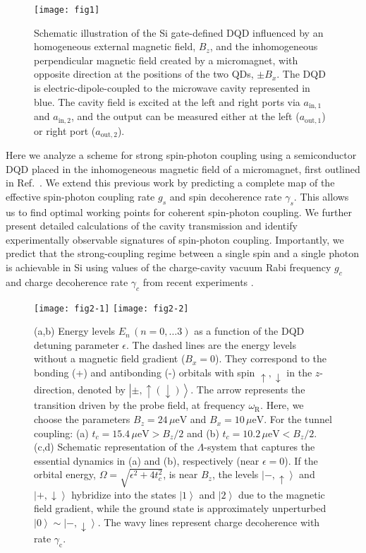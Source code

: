 \documentclass[twocolumn,english,aps,prl,preprint,reprint,showpacs,longbibliography,showkeys]{revtex4-1}
\begin{document}
\begin{figure}
\texttt{[image: fig1]}
\protect\caption{\label{fig:figure1-1}  Schematic illustration of the Si gate-defined DQD influenced by an homogeneous external magnetic field, $B_z$, and the inhomogeneous perpendicular magnetic field created by  a micromagnet, with opposite direction at the positions of the two QDs, $\pm B_x$. The DQD is electric-dipole-coupled to the microwave cavity represented in blue. 
The cavity field is excited at the left and right ports via $a_{\mathrm{in},1}$ and $a_{\mathrm{in},2}$, and the output can be measured  either at the left ($a_{\mathrm{out},1}$) or right port ($a_{\mathrm{out},2}$).}
\end{figure} 

Here we analyze a scheme for strong spin-photon coupling using a semiconductor DQD placed in the inhomogeneous magnetic field of a micromagnet, first outlined in Ref.~\cite{Hu2012}. We extend this previous work by predicting a complete map of the effective spin-photon coupling rate $g_s$ and spin decoherence rate $\gamma_s$. 
This allows us to find optimal working points for coherent spin-photon coupling. 
We further present detailed calculations of the cavity transmission and identify experimentally observable signatures of spin-photon coupling. Importantly, we predict that the strong-coupling regime between a single spin and a single photon is achievable in Si using values of the charge-cavity vacuum Rabi frequency $g_c$ and charge decoherence rate $\gamma_c$ from recent experiments \cite{Mi2017,Mi2017b}.





\begin{figure}
\texttt{[image: fig2-1]}
\texttt{[image: fig2-2]}
\protect\caption{\label{fig:figure1}(a,b) Energy levels $E_n\, (n=0,\dots 3)$ as a function of the DQD detuning parameter $\epsilon$. The dashed lines  are the energy levels without a magnetic  field gradient  ($B_x=0$).
They correspond to the bonding (+) and antibonding (-) orbitals with spin $\uparrow,\downarrow$ in the $z$-direction, denoted by $\left|\pm,\uparrow(\downarrow)\right\rangle$.
The arrow represents the transition driven by the probe field, at frequency  $\omega_{\mathrm{R}}$. Here, we choose the parameters $B_z=24\,\mu \mathrm{eV}$ and $B_x=10\,\mu \mathrm{eV}$. For the tunnel coupling: (a) $t_c=15.4\,\mu \mathrm{eV}>B_z/2$ and (b) $t_c=10.2\,\mu \mathrm{eV}<B_z/2$. (c,d) Schematic representation of the $\Lambda$-system that captures the essential dynamics  in (a) and (b), respectively (near $\epsilon=0$). If the orbital energy, $\Omega=\sqrt{\epsilon^2+4t_c^2}$, is near $B_z$, the  levels $\left|-,\uparrow\right\rangle$ and $\left|+,\downarrow\right\rangle$ hybridize into the states $\left|1\right\rangle$ and $\left|2\right\rangle$ due to the magnetic  field gradient, while the ground state is approximately unperturbed $\left|0\right\rangle\sim\left|-,\downarrow\right\rangle$. The wavy lines represent  charge decoherence with rate $\gamma_{\mathrm{c}}$.}
\end{figure} 
\end{document}

